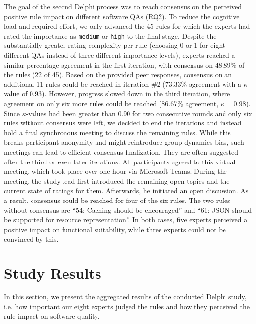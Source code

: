 \documentclass[runningheads]{llncs}
\begin{document}
The goal of the second Delphi process was to reach consensus on the perceived positive rule impact on different software QAs (RQ2).
To reduce the cognitive load and required effort, we only advanced the 45 rules for which the experts had rated the importance as \texttt{medium} or \texttt{high} to the final stage.
Despite the substantially greater rating complexity per rule (choosing 0 or 1 for eight different QAs instead of three different importance levels), experts reached a similar percentage agreement in the first iteration, with consensus on 48.89\% of the rules (22 of 45).
Based on the provided peer responses, consensus on an additional 11 rules could be reached in iteration \#2 (73.33\% agreement with a $\kappa$-value of 0.93).
However, progress slowed down in the third iteration, where agreement on only six more rules could be reached (86.67\% agreement, $\kappa = 0.98$).
Since $\kappa$-values had been greater than 0.90 for two consecutive rounds and only six rules without consensus were left, we decided to end the iterations and instead hold a final synchronous meeting to discuss the remaining rules.
While this breaks participant anonymity and might reintroduce group dynamics bias, such meetings can lead to efficient consensus finalization.
They are often suggested after the third or even later iterations.
All participants agreed to this virtual meeting, which took place over one hour via Microsoft Teams.
During the meeting, the study lead first introduced the remaining open topics and the current state of ratings for them.
Afterwards, he initiated an open discussion.
As a result, consensus could be reached for four of the six rules.
The two rules without consensus are \enquote{54: Caching should be encouraged} and \enquote{61: JSON should be supported for resource representation}.
In both cases, five experts perceived a positive impact on functional suitability, while three experts could not be convinced by this.

\section{Study Results}
\label{sec:results}
In this section, we present the aggregated results of the conducted Delphi study, i.e. how important our eight experts judged the rules and how they perceived the rule impact on software quality.
\end{document}
